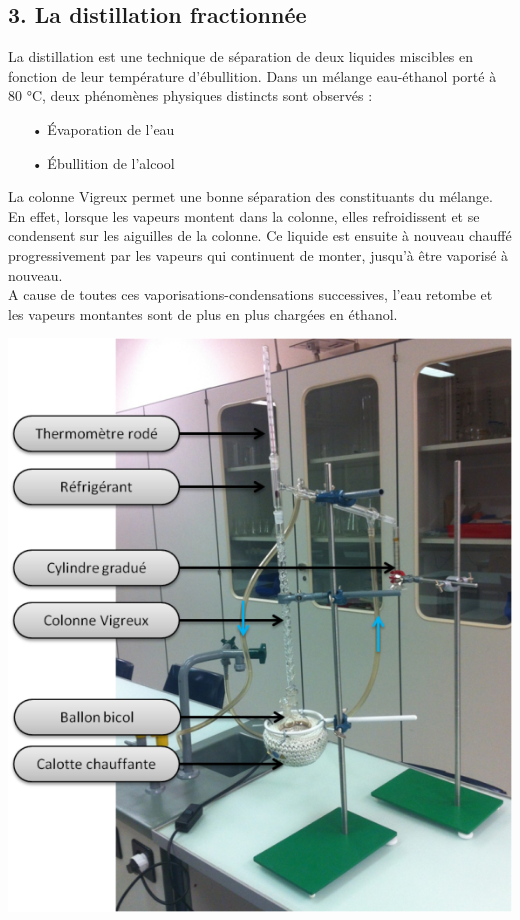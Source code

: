 \documentclass[11pt]{article}
\begin{document}
\subsection*{3. La distillation fractionnée}
La  distillation   est  une  technique   de  séparation   de  deux  liquides   miscibles   en  fonction  de  leur température  d'ébullition.  Dans  un  mélange  eau-éthanol  porté  à  80  °C,  deux  phénomènes  physiques distincts sont observés :\\
\begin{minipage}{.6\textwidth}%
\begin{itemize}
\item[•] Évaporation de l'eau
\item[•] Ébullition de l'alcool
\end{itemize}
La  colonne  Vigreux  permet  une  bonne  séparation  des constituants  du  mélange.  En  effet,  
lorsque  les  vapeurs montent    dans   la   colonne,    elles   refroidissent    et   se 
condensent  sur les aiguilles  de la colonne.  Ce  liquide  est ensuite   à   nouveau   chauffé   
progressivement   par   les vapeurs  qui continuent  de monter, jusqu'à être vaporisé à nouveau.\\

A    cause    de    toutes    ces    vaporisations-condensations successives,  l'eau  retombe  et  
les  vapeurs  montantes  sont de plus en plus chargées en éthanol.
\end{minipage}
\begin{minipage}{.4\textwidth}%
\includegraphics[scale=0.25]{vin2.png}
\end{minipage}\\
\end{document}

